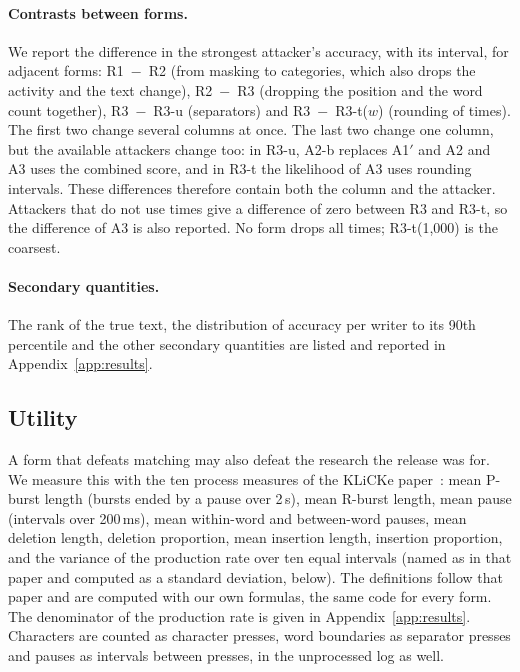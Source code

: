 \paragraph{Contrasts between forms.}
We report the difference in the strongest attacker's accuracy, with its interval, for adjacent forms: R1~$-$~R2 (from
masking to categories, which also drops the activity and the text change), R2~$-$~R3 (dropping the position and the word
count together), R3~$-$~R3-u (separators) and R3~$-$~R3-t($w$) (rounding of times). The first two change several columns
at once. The last two change one column, but the available attackers change too: in R3-u, A2-b replaces A1$'$ and A2 and
A3 uses the combined score, and in R3-t the likelihood of A3 uses rounding intervals. These differences therefore
contain both the column and the attacker. Attackers that do not use times give a difference of zero between R3 and
R3-t, so the difference of A3 is also reported. No form drops all times; R3-t(1{,}000) is the coarsest.

\paragraph{Secondary quantities.}
The rank of the true text, the distribution of accuracy per writer to its 90th percentile and the other secondary
quantities are listed and reported in Appendix~\ref{app:results}.

\subsection{Utility}
\label{sec:protocol:utility}

A form that defeats matching may also defeat the research the release was for. We measure this with the ten process
measures of the KLiCKe paper~\cite{tian2025klicke}: mean P-burst length (bursts ended by a pause over 2\,s), mean
R-burst length, mean pause (intervals over 200\,ms), mean within-word and between-word pauses, mean deletion length,
deletion proportion, mean insertion length, insertion proportion, and the variance of the production rate over ten equal
intervals (named as in that paper and computed as a standard deviation, below). The definitions follow that paper and are computed with our own formulas, the same code for every form. The
denominator of the production rate is given in Appendix~\ref{app:results}. Characters are counted as character
presses, word boundaries as separator presses and pauses as intervals between presses, in the unprocessed log as well.

